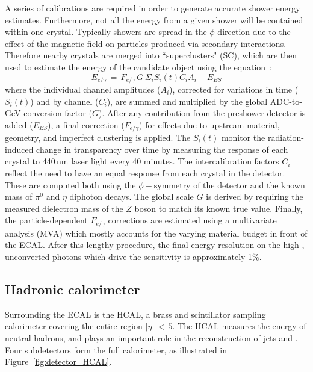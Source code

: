 A series of calibrations are required in order to generate accurate shower energy estimates.
Furthermore, not all the energy from a given shower will be contained within one crystal.
Typically showers are spread in the $\phi$ direction due to the effect of the magnetic field on particles produced via secondary interactions.
Therefore nearby crystals are merged into ``superclusters" (SC), 
which are then used to estimate the energy of the candidate object using the equation~\cite{ECALperformance}:
\begin{equation}
E_{e/\gamma}\, =\, F_{e/\gamma}\, G\, \Sigma_i S_i (t) C_i A_i + E_{ES}
\label{eq:}
\end{equation}
where the individual channel amplitudes ($A_i$), corrected for variations in time ($S_i (t)$) and by channel ($C_i$), 
are summed and multiplied by the global ADC-to-GeV conversion factor ($G$).
After any contribution from the preshower detector is added ($E_{ES}$), 
a final correction ($F_{e/\gamma}$) for effects due to upstream material, geometry, and imperfect clustering is applied. 
The $S_i (t)$ monitor the radiation-induced change in transparency over time by measuring the response of each crystal to 440\,nm laser light every 40 minutes. %
The intercalibration factors $C_i$ reflect the need to have an equal response from each crystal in the detector.
These are computed both using the $\phi-\textrm{symmetry}$ of the detector and the known mass of $\pi^{0}$ and $\eta$ diphoton decays.
The global scale $G$ is derived by requiring the measured dielectron mass of the $Z$ boson to match its known true value.
Finally, the particle-dependent $F_{e/\gamma}$ corrections are estimated using a multivariate analysis (MVA) which mostly accounts for the varying material budget in front of the ECAL.
After this lengthy procedure, the final energy resolution on the high \pt, unconverted photons which drive the \Hgg sensitivity is approximately 1\%.

\subsection{Hadronic calorimeter}

Surrounding the ECAL is the HCAL, a brass and scintillator sampling calorimeter covering the entire region $|\eta|\,<\,5$.
The HCAL measures the energy of neutral hadrons, and plays an important role in the reconstruction of jets and \met.
Four subdetectors form the full calorimeter, as illustrated in Figure~\ref{fig:detector_HCAL}.

